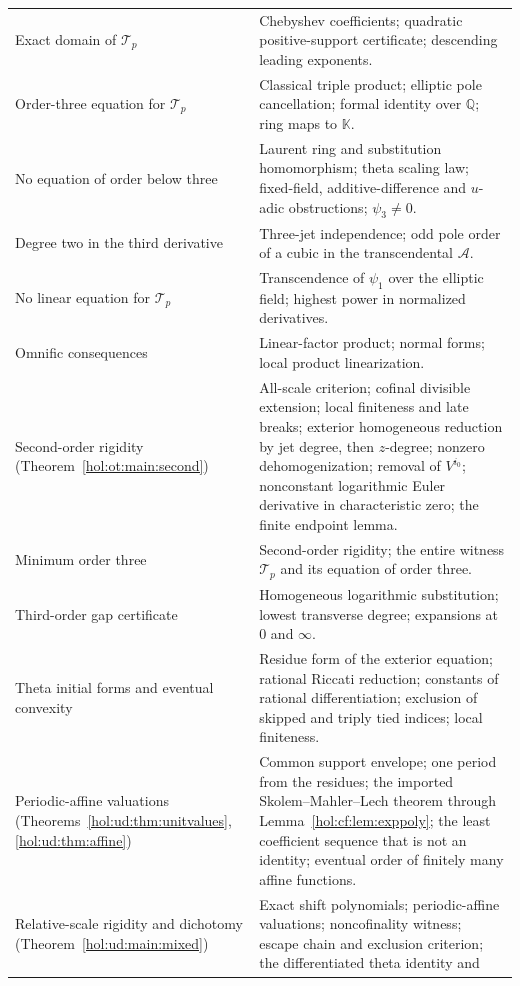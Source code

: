 \documentclass[11pt]{article}
\numberwithin{equation}{section}
\theoremstyle{definition}
\theoremstyle{remark}
\newcommand{\Q}{\mathbb Q}
\newcommand{\KK}{\mathbb K}
\begin{document}
\begin{longtable}{@{}>{\raggedright\arraybackslash}p{}
                    >{\raggedright\arraybackslash}p{}@{}}
Exact domain of $\mathcal T_p$ & Chebyshev coefficients; quadratic
positive-support certificate; descending leading exponents.\\
Order-three equation for $\mathcal T_p$ & Classical triple product; elliptic
pole cancellation; formal identity over $\Q$; ring maps to $\KK$.\\
No equation of order below three & Laurent ring and substitution
homomorphism; theta scaling law; fixed-field, additive-difference and
$u$-adic obstructions; $\psi_3\ne0$.\\
Degree two in the third derivative & Three-jet independence; odd pole order
of a cubic in the transcendental $\mathcal A$.\\
No linear equation for $\mathcal T_p$ & Transcendence of $\psi_1$ over the
elliptic field; highest power in normalized derivatives.\\
Omnific consequences & Linear-factor product; normal forms; local product
linearization.\\
Second-order rigidity (Theorem~\ref{hol:ot:main:second}) & All-scale
criterion; cofinal divisible extension; local finiteness and late breaks;
exterior homogeneous reduction by jet degree, then $z$-degree; nonzero
dehomogenization; removal of $V^{i_0}$; nonconstant logarithmic Euler
derivative in characteristic zero; the finite endpoint lemma.\\
Minimum order three & Second-order rigidity; the entire witness
$\mathcal T_p$ and its equation of order three.\\
Third-order gap certificate & Homogeneous logarithmic substitution; lowest
transverse degree; expansions at $0$ and $\infty$.\\
Theta initial forms and eventual convexity & Residue form of the exterior
equation; rational Riccati reduction; constants of rational differentiation;
exclusion of skipped and triply tied indices; local finiteness.\\
Periodic-affine valuations (Theorems~\ref{hol:ud:thm:unitvalues},
\ref{hol:ud:thm:affine}) & Common support envelope; one period from the
residues; the imported Skolem--Mahler--Lech theorem through
Lemma~\ref{hol:cf:lem:exppoly}; the least coefficient sequence that is not an
identity; eventual order of finitely many affine functions.\\
Relative-scale rigidity and dichotomy (Theorem~\ref{hol:ud:main:mixed}) &
Exact shift polynomials; periodic-affine valuations; noncofinality witness;
escape chain and exclusion criterion; the differentiated theta identity and

\end{longtable}
\end{document}
